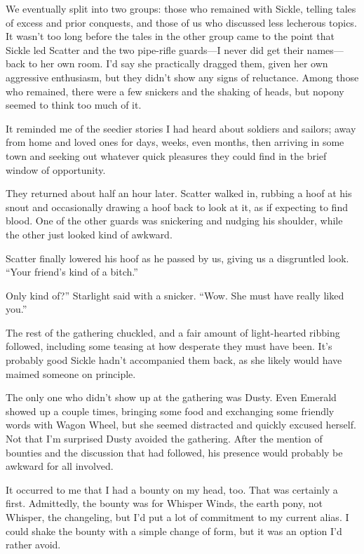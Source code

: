 We eventually split into two groups: those who remained with Sickle, telling tales of excess and prior conquests, and those of us who discussed less lecherous topics. It wasn’t too long before the tales in the other group came to the point that Sickle led Scatter and the two pipe-rifle guards—I never did get their names—back to her own room. I’d say she practically dragged them, given her own aggressive enthusiasm, but they didn’t show any signs of reluctance. Among those who remained, there were a few snickers and the shaking of heads, but nopony seemed to think too much of it.

It reminded me of the seedier stories I had heard about soldiers and sailors; away from home and loved ones for days, weeks, even months, then arriving in some town and seeking out whatever quick pleasures they could find in the brief window of opportunity.

They returned about half an hour later. Scatter walked in, rubbing a hoof at his snout and occasionally drawing a hoof back to look at it, as if expecting to find blood. One of the other guards was snickering and nudging his shoulder, while the other just looked kind of awkward.

Scatter finally lowered his hoof as he passed by us, giving us a disgruntled look. “Your friend’s kind of a bitch.”

\leavevmode{}Only kind of?” Starlight said with a snicker. “Wow. She must have really liked you.”

The rest of the gathering chuckled, and a fair amount of light-hearted ribbing followed, including some teasing at how desperate they must have been. It’s probably good Sickle hadn’t accompanied them back, as she likely would have maimed someone on principle.

The only one who didn’t show up at the gathering was Dusty. Even Emerald showed up a couple times, bringing some food and exchanging some friendly words with Wagon Wheel, but she seemed distracted and quickly excused herself. Not that I’m surprised Dusty avoided the gathering. After the mention of bounties and the discussion that had followed, his presence would probably be awkward for all involved.

It occurred to me that I had a bounty on my head, too. That was certainly a first. Admittedly, the bounty was for Whisper Winds, the earth pony, not Whisper, the changeling, but I’d put a lot of commitment to my current alias. I could shake the bounty with a simple change of form, but it was an option I’d rather avoid.

